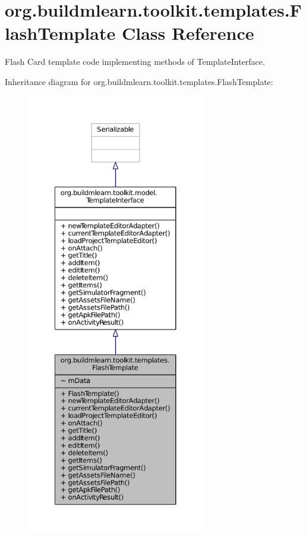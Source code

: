 \hypertarget{classorg_1_1buildmlearn_1_1toolkit_1_1templates_1_1FlashTemplate}{\section{org.\-buildmlearn.\-toolkit.\-templates.\-Flash\-Template Class Reference}
\label{classorg_1_1buildmlearn_1_1toolkit_1_1templates_1_1FlashTemplate}
}


Flash Card template code implementing methods of Template\-Interface.  




Inheritance diagram for org.\-buildmlearn.\-toolkit.\-templates.\-Flash\-Template\-:
\nopagebreak
\begin{figure}[H]
\begin{center}
\leavevmode
\includegraphics[height=550pt]{d4/de9/classorg_1_1buildmlearn_1_1toolkit_1_1templates_1_1FlashTemplate__inherit__graph}
\end{center}
\end{figure}


